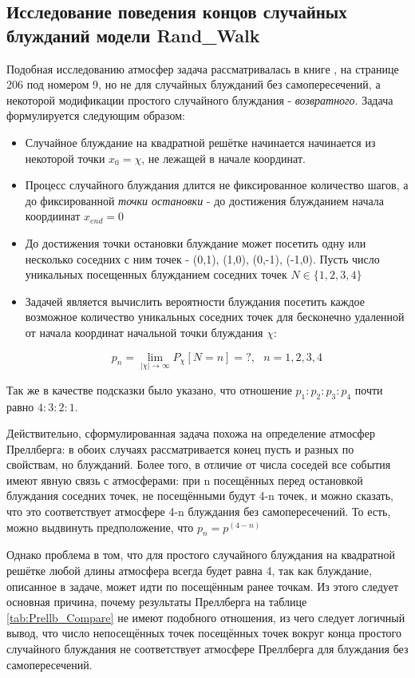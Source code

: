 \subsection{Исследование поведения концов случайных блужданий модели Rand\_Walk}

Подобная исследованию атмосфер \cite{owczarek2008scaling} задача рассматривалась в книге \cite{Spitser1969}, на странице 206 под номером 9, но не для случайных блужданий без самопересечений, а некоторой модификации простого случайного блуждания - \textit{возвратного}. Задача формулируется следующим образом:

\begin{itemize}
    \item Случайное блуждание на квадратной решётке начинается начинается из некоторой точки $x_0 = \chi$, не лежащей в начале координат.
    \item Процесс случайного блуждания длится не фиксированное количество шагов, а до фиксированной \textit{точки остановки} - до достижения блужданием начала коордиинат $x_{end} = 0$
    \item До достижения точки остановки блуждание может посетить одну или несколько соседних с ним точек - (0,1), (1,0), (0,-1), (-1,0). Пусть число уникальных посещенных блужданием соседних точек  $N \in \{1, 2, 3, 4\}$
    \item Задачей является вычислить вероятности блуждания посетить каждое возможное количество уникальных соседних точек для бесконечно удаленной от начала координат начальной точки блуждания $\chi$:
    
    \[ p_{n} = \lim_{|\chi|\to \infty} P_{\chi}[N = n] = ?,\ \ \ n = 1, 2, 3, 4\]
\end{itemize}

Так же в качестве подсказки было указано, что отношение $p_1:p_2:p_3:p_4$ почти равно $4:3:2:1$.

Действительно, сформулированная задача похожа на определение атмосфер Преллберга: в обоих случаях рассматривается конец пусть и разных по свойствам, но блужданий. Более того, в отличие от числа соседей все события имеют явную связь с атмосферами: при n посещённых перед остановкой блуждания соседних точек, не посещёнными будут 4-n точек, и можно сказать, что это соответствует атмосфере 4-n блуждания без самопересечений. То есть, можно выдвинуть предположение, что $p_n = p^{(4-n)}$

Однако проблема в том, что для простого случайного блуждания на квадратной решётке любой длины атмосфера всегда будет равна 4, так как блуждание, описанное в задаче, может идти по посещённым ранее точкам. Из этого следует основная причина, почему результаты Преллберга на таблице \ref{tab:Prellb_Compare} не имеют подобного отношения, из чего следует логичный вывод, что число непосещённых точек посещённых точек вокруг конца простого случайного блуждания не соответствует атмосфере Преллберга для блуждания без самопересечений.

